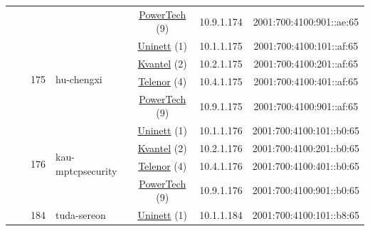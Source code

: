 \begin{small}
\begin{center}
\begin{longtable}{|c|c|c|c|c|c|c|c|}
  &  &  &  & \multicolumn{2}{|c|}{\tiny{\href{http://www.powertech.no}{PowerTech} (9)}} & \tiny{10.9.1.174} & \tiny{2001:700:4100:901::ae:65} \\* \cline{3-3}\cline{4-4}\cline{5-5}\cline{6-6}\cline{7-7}\cline{8-8}
  &  & \multirow{4}{*}{\tiny{175}} & \multicolumn{1}{|l|}{\multirow{4}{*}{\tiny{hu-chengxi}}} & \multicolumn{2}{|c|}{\tiny{\href{https://www.uninett.no}{Uninett} (1)}} & \tiny{10.1.1.175} & \tiny{2001:700:4100:101::af:65} \\* \cline{5-5}\cline{6-6}\cline{7-7}\cline{8-8}
  &  &  &  & \multicolumn{2}{|c|}{\tiny{\href{http://kvantel.no}{Kvantel} (2)}} & \tiny{10.2.1.175} & \tiny{2001:700:4100:201::af:65} \\* \cline{5-5}\cline{6-6}\cline{7-7}\cline{8-8}
  &  &  &  & \multicolumn{2}{|c|}{\tiny{\href{https://www.telenor.no}{Telenor} (4)}} & \tiny{10.4.1.175} & \tiny{2001:700:4100:401::af:65} \\* \cline{5-5}\cline{6-6}\cline{7-7}\cline{8-8}
  &  &  &  & \multicolumn{2}{|c|}{\tiny{\href{http://www.powertech.no}{PowerTech} (9)}} & \tiny{10.9.1.175} & \tiny{2001:700:4100:901::af:65} \\* \cline{3-3}\cline{4-4}\cline{5-5}\cline{6-6}\cline{7-7}\cline{8-8}
  &  & \multirow{4}{*}{\tiny{176}} & \multicolumn{1}{|l|}{\multirow{4}{*}{\tiny{kau-mptcpsecurity}}} & \multicolumn{2}{|c|}{\tiny{\href{https://www.uninett.no}{Uninett} (1)}} & \tiny{10.1.1.176} & \tiny{2001:700:4100:101::b0:65} \\* \cline{5-5}\cline{6-6}\cline{7-7}\cline{8-8}
  &  &  &  & \multicolumn{2}{|c|}{\tiny{\href{http://kvantel.no}{Kvantel} (2)}} & \tiny{10.2.1.176} & \tiny{2001:700:4100:201::b0:65} \\* \cline{5-5}\cline{6-6}\cline{7-7}\cline{8-8}
  &  &  &  & \multicolumn{2}{|c|}{\tiny{\href{https://www.telenor.no}{Telenor} (4)}} & \tiny{10.4.1.176} & \tiny{2001:700:4100:401::b0:65} \\* \cline{5-5}\cline{6-6}\cline{7-7}\cline{8-8}
  &  &  &  & \multicolumn{2}{|c|}{\tiny{\href{http://www.powertech.no}{PowerTech} (9)}} & \tiny{10.9.1.176} & \tiny{2001:700:4100:901::b0:65} \\* \cline{3-3}\cline{4-4}\cline{5-5}\cline{6-6}\cline{7-7}\cline{8-8}
  &  & \multirow{4}{*}{\tiny{184}} & \multicolumn{1}{|l|}{\multirow{4}{*}{\tiny{tuda-sereon}}} & \multicolumn{2}{|c|}{\tiny{\href{https://www.uninett.no}{Uninett} (1)}} & \tiny{10.1.1.184} & \tiny{2001:700:4100:101::b8:65} \\* \cline{5-5}\cline{6-6}\cline{7-7}\cline{8-8}

\end{longtable}
\end{center}
\end{small}
